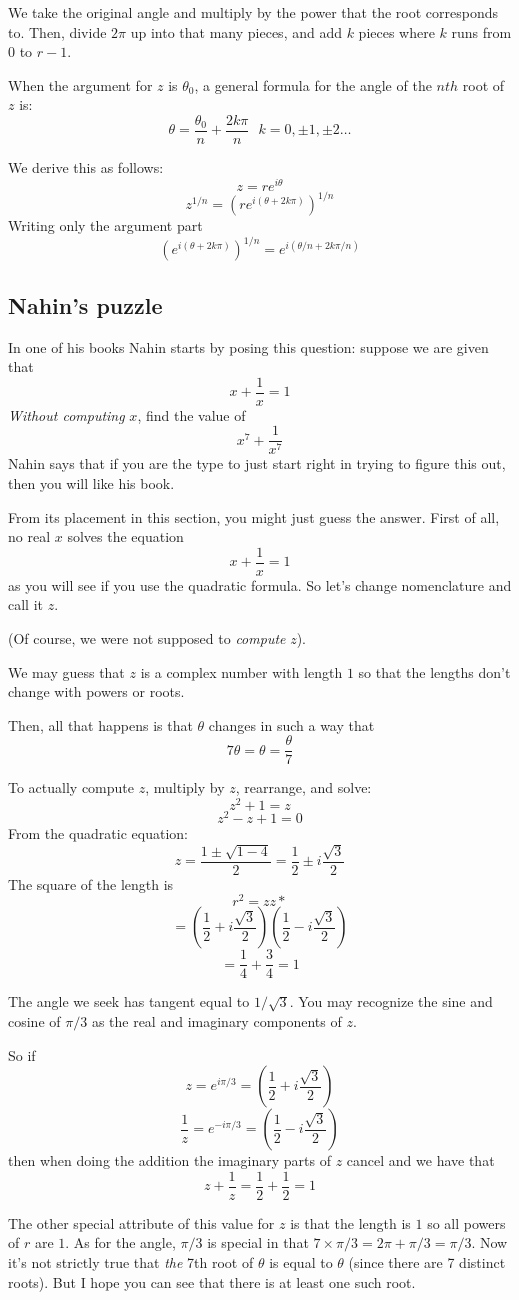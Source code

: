 \documentclass[11pt, oneside]{article}
\begin{document}
We take the original angle and multiply by the power that the root corresponds to.  Then, divide $2\pi$ up into that many pieces, and add $k$ pieces where $k$ runs from $0$ to $r - 1$.

When the argument for $z$ is $\theta_0$, a general formula for the angle of the $nth$ root of $z$ is:
\[ \theta = \frac{\theta_0}{n} + \frac{2k\pi}{n} \ \ \ k = 0, \pm 1, \pm 2 \dots \]

We derive this as follows:
\[ z = r e^{i \theta} \]
\[ z^{1/n} = (r e^{i (\theta + 2k \pi)} )^{1/n} \]
Writing only the argument part
\[ (e^{i (\theta + 2k \pi)} )^{1/n} = e^{i (\theta/n + 2k \pi/n)}  \]

\subsection*{Nahin's puzzle}
In one of his books Nahin starts by posing this question:  suppose we are given that 
\[ x + \frac{1}{x} = 1 \]
\emph{Without computing} $x$, find the value of
\[ x^7 + \frac{1}{x^7} \]
Nahin says that if you are the type to just start right in trying to figure this out, then you will like his book.

From its placement in this section, you might just guess the answer.  First of all, no real $x$ solves the equation
\[ x + \frac{1}{x} = 1 \]
as you will see if you use the quadratic formula.  So let's change nomenclature and call it $z$. 

(Of course, we were not supposed to \emph{compute} $z$).

We may guess that $z$ is a complex number with length $1$ so that the lengths don't change with powers or roots.  

Then, all that happens is that $\theta$ changes in such a way that 
\[ 7 \theta = \theta = \frac{\theta}{7}  \]

To actually compute $z$, multiply by $z$, rearrange, and solve:
\[ z^2 + 1 = z \]
\[ z^2 - z + 1 = 0 \]
From the quadratic equation:
\[ z = \frac{1 \pm \sqrt{1 - 4}}{2} = \frac{1}{2} \pm i \frac{\sqrt{3}}{2}  \]
The square of the length is
\[ r^2 = zz* \]
\[ = (\frac{1}{2} + i \frac{\sqrt{3}}{2}) (\frac{1}{2} - i \frac{\sqrt{3}}{2})  \]
\[ = \frac{1}{4} + \frac{3}{4} = 1 \]

The angle we seek has tangent equal to $1/\sqrt{3}$.  You may recognize the sine and cosine of $\pi/3$ as the real and imaginary components of $z$.

So if 
\[ z = e^{i \pi/3} = (\frac{1}{2} + i \frac{\sqrt{3}}{2}) \]
\[ \frac{1}{z} = e^{-i \pi/3} = (\frac{1}{2} - i \frac{\sqrt{3}}{2}) \]
then when doing the addition the imaginary parts of $z$ cancel and we have that 
\[ z + \frac{1}{z} = \frac{1}{2} + \frac{1}{2} = 1 \]

The other special attribute of this value for $z$ is that the length is $1$ so all powers of $r$ are $1$.  As for the angle, $\pi/3$ is special in that $7 \times \pi/3 = 2 \pi + \pi/3 = \pi/3$.  Now it's not strictly true that \emph{the} 7th root of $\theta$ is equal to $\theta$ (since there are 7 distinct roots).  But I hope you can see that there is at least one such root.
\end{document}
